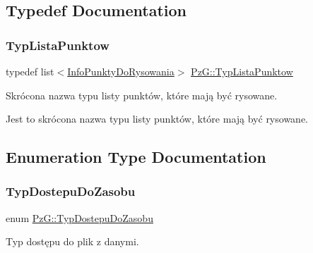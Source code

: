 \subsection{Typedef Documentation}
\mbox{\label{namespace_pz_g_a663e923efc195ea10f6f7086c6da490b}} 
\subsubsection{\texorpdfstring{TypListaPunktow}{TypListaPunktow}}
{\footnotesize\ttfamily typedef list$<$\mbox{\hyperlink{class_pz_g_1_1_info_punkty_do_rysowania}{Info\+Punkty\+Do\+Rysowania}}$>$ \mbox{\hyperlink{namespace_pz_g_a663e923efc195ea10f6f7086c6da490b}{Pz\+G\+::\+Typ\+Lista\+Punktow}}}



Skrócona nazwa typu listy punktów, które mają być rysowane. 

Jest to skrócona nazwa typu listy punktów, które mają być rysowane. 

\subsection{Enumeration Type Documentation}
\mbox{\label{namespace_pz_g_af74528dea7061dcb07cf44f315703cf4}} 
\subsubsection{\texorpdfstring{TypDostepuDoZasobu}{TypDostepuDoZasobu}}
{\footnotesize\ttfamily enum \mbox{\hyperlink{namespace_pz_g_af74528dea7061dcb07cf44f315703cf4}{Pz\+G\+::\+Typ\+Dostepu\+Do\+Zasobu}}}



Typ dostępu do plik z danymi. 

